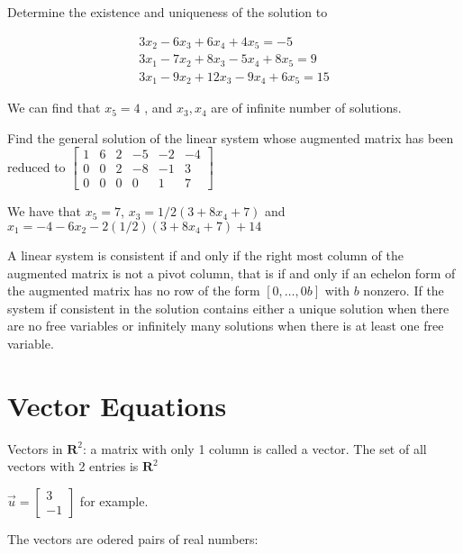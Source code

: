 \documentclass[../linalg.tex]{subfiles}
\begin{document}
\begin{example}
    Determine the existence and uniqueness of the solution to 

    \begin{align*}
    3x_2-6x_3+6x_4+4x_5=-5\\ 
    3x_1-7x_2+8x_3-5x_4+8x_5 = 9\\
    3x_1-9x_2+12x_3-9x_4+6x_5=15
    \end{align*}

    We can find that $x_5=4$ , and $x_3,x_4$ are of infinite number of solutions. 
\end{example}

\begin{example}
    Find the general solution of the linear system whose augmented matrix has been reduced to 
    $\begin{bmatrix}
        1 & 6 & 2 & -5 & -2 & -4 \\
        0 & 0 & 2 & -8 & -1 & 3 \\
        0 & 0 & 0 & 0& 1 & 7
    \end{bmatrix}$

    We have that $x_5=7$, $x_3=1/2(3+8x_4+7)$ and $x_1=-4-6x_2-2(1/2)(3+8x_4+7)+14$
\end{example}

\begin{theorem}
    A linear system is consistent if and only if the right most column of the augmented matrix is not a pivot column, that is if and only if an echelon form of the augmented matrix 
    has no row of the form $[0,\dots, 0 b]$ with $b$ nonzero. If the system if consistent in the solution contains either a unique solution when there are no free variables or infinitely many solutions when there is at least one free variable.
\end{theorem}

\section{Vector Equations}
Vectors in $\textbf{R}^2$: a matrix with only 1 column is called a vector. The set of all vectors with 2 entries is $\textbf{R}^2$

$\vec{u}=\begin{bmatrix}3\\ -1\end{bmatrix}$ for example.

The vectors are odered pairs of real numbers:
\end{document}
